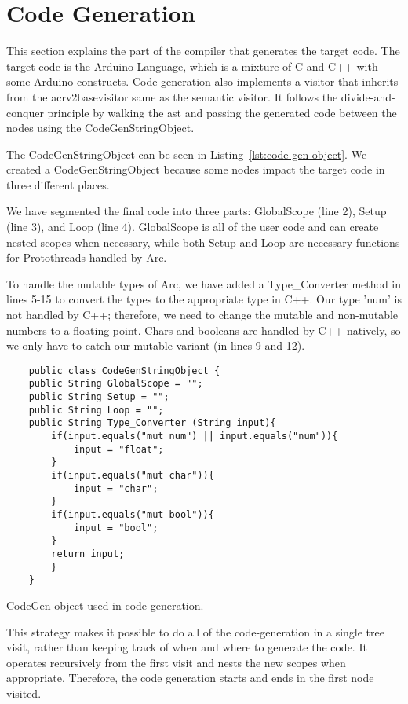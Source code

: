 \section{Code Generation}\label{sec:codegeneration}
This section explains the part of the compiler that generates the target code. The target code is the Arduino Language, which is a mixture of C and C++ with some Arduino constructs. Code generation also implements a visitor that inherits from the acrv2basevisitor same as the semantic visitor. It follows the divide-and-conquer principle by walking the \gls{ast} and passing the generated code between the nodes using the CodeGenStringObject.

The CodeGenStringObject can be seen in Listing~\ref{lst:code gen object}. We created a CodeGenStringObject because some nodes impact the target code in three different places.

We have segmented the final code into three parts: GlobalScope (line 2), Setup (line 3), and Loop (line 4). GlobalScope is all of the user code and can create nested scopes when necessary, while both Setup and Loop are necessary functions for Protothreads handled by Arc.

To handle the mutable types of Arc, we have added a Type\_Converter method in lines 5-15 to convert the types to the appropriate type in C++. Our type 'num' is not handled by C++; therefore, we need to change the mutable and non-mutable numbers to a floating-point. Chars and booleans are handled by C++ natively, so we only have to catch our mutable variant (in lines 9 and 12).


\begin{listing}[htb!]
    \begin{verbatim}
    public class CodeGenStringObject {
    public String GlobalScope = "";
    public String Setup = "";
    public String Loop = "";
    public String Type_Converter (String input){
        if(input.equals("mut num") || input.equals("num")){
            input = "float";
        }
        if(input.equals("mut char")){
            input = "char";
        }
        if(input.equals("mut bool")){
            input = "bool";
        }
        return input;
        }
    }
    \end{verbatim}
    \caption{CodeGen object used in code generation.}
    \label{lst:code gen object}
\end{listing}


This strategy makes it possible to do all of the code-generation in a single tree visit, rather than keeping track of when and where to generate the code. It operates recursively from the first visit and nests the new scopes when appropriate. Therefore, the code generation starts and ends in the first node visited. 

